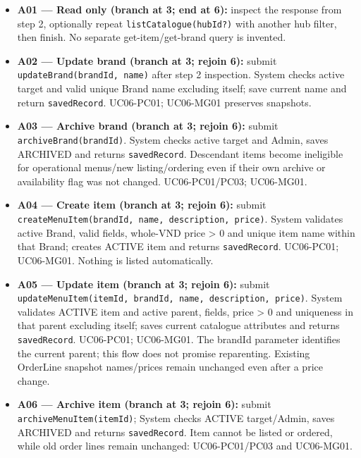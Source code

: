 \begin{itemize}
\item \textbf{A01 --- Read only (branch at 3; end at 6):} inspect the response from step 2, optionally repeat \texttt{listCatalogue(hubId?)} with another hub filter, then finish. No separate get-item/get-brand query is invented.

\item \textbf{A02 --- Update brand (branch at 3; rejoin 6):} submit \texttt{updateBrand(brandId, name)} after step 2 inspection. System checks active target and valid unique Brand name excluding itself; save current name and return \texttt{savedRecord}. UC06-PC01; UC06-MG01 preserves snapshots.

\item \textbf{A03 --- Archive brand (branch at 3; rejoin 6):} submit \texttt{archiveBrand(brandId)}. System checks active target and Admin, saves ARCHIVED and returns \texttt{savedRecord}. Descendant items become ineligible for operational menus/new listing/ordering even if their own archive or availability flag was not changed. UC06-PC01/PC03; UC06-MG01.

\item \textbf{A04 --- Create item (branch at 3; rejoin 6):} submit \texttt{createMenuItem(brandId, name, description, price)}. System validates active Brand, valid fields, whole-VND price \textgreater{} 0 and unique item name within that Brand; creates ACTIVE item and returns \texttt{savedRecord}. UC06-PC01; UC06-MG01. Nothing is listed automatically.

\item \textbf{A05 --- Update item (branch at 3; rejoin 6):} submit \texttt{updateMenuItem(itemId, brandId, name, description, price)}. System validates ACTIVE item and active parent, fields, price \textgreater{} 0 and uniqueness in that parent excluding itself; saves current catalogue attributes and returns \texttt{savedRecord}. UC06-PC01; UC06-MG01. The brandId parameter identifies the current parent; this flow does not promise reparenting. Existing OrderLine snapshot names/prices remain unchanged even after a price change.

\item \textbf{A06 --- Archive item (branch at 3; rejoin 6):} submit \texttt{archiveMenuItem(itemId)}; System checks ACTIVE target/Admin, saves ARCHIVED and returns \texttt{savedRecord}. Item cannot be listed or ordered, while old order lines remain unchanged: UC06-PC01/PC03 and UC06-MG01.


\end{itemize}
